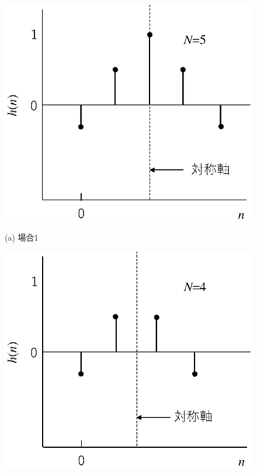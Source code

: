 \begin{figure}[H]
\begin{center}
\begin{minipage}[b]{.35\textwidth}
\begin{center}
\includegraphics[width=.98\textwidth]{fig/zu-6-9-a.eps}

(a) 場合1
\end{center}
\end{minipage}
\begin{minipage}[b]{.35\textwidth}
\begin{center}
\includegraphics[width=.98\textwidth]{fig/zu-6-9-b.eps}


\end{center}
\end{minipage}
\end{center}
\end{figure}

